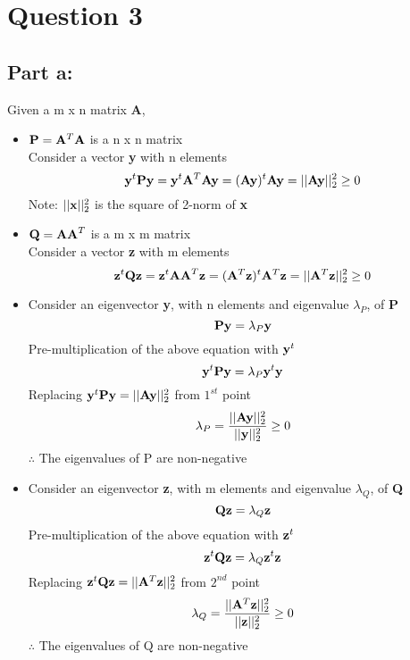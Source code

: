 \documentclass[12pt, a4paper]{article}
\begin{document}
\vspace*{-22pt}
\section*{Question 3}

\subsection*{Part a:} 
Given a m x n matrix {\bf A},\\
\begin {itemize}
\item ${\bf P}={\bf A}^T{\bf A}$ is a n x n matrix\\
Consider a vector {\bf y} with n elements
\[{\bf y}^t{\bf Py}={\bf y}^t{\bf A}^T{\bf Ay}=({\bf Ay})^t{\bf Ay}= ||{\bf Ay}||_2^2\geq 0\] 
Note: $||{\bf x}||_2^2$ is the square of 2-norm of {\bf x}

\item ${\bf Q}={\bf AA}^T$ is a m x m matrix\\
Consider a vector {\bf z} with m elements
\[{\bf z}^t{\bf Qz}={\bf z}^t{\bf AA}^T{\bf z}=({\bf A}^T{\bf z})^t{\bf A}^T{\bf z}=||{\bf A}^T{\bf z}||_2^2\geq 0\] 

\item Consider an eigenvector {\bf y}, with n elements and eigenvalue $\lambda_P$, of {\bf P}
\[{\bf Py}= \lambda_P{\bf y}\] 
Pre-multiplication of the above equation with ${\bf y}^t$
\[{\bf y}^t{\bf Py}=\lambda_P{\bf y}^t{\bf y}\]
Replacing ${\bf y}^t{\bf Py}=||{\bf Ay}||_2^2$ from $1^{st}$ point
\[\lambda_P=\frac{||{\bf Ay}||_2^2}{||{\bf y}||_2^2}\geq 0\]
$\therefore$ The eigenvalues of P are non-negative

\item Consider an eigenvector {\bf z}, with m elements and eigenvalue $\lambda_Q$, of {\bf Q}
\[{\bf Qz}= \lambda_Q{\bf z}\] 
Pre-multiplication of the above equation with ${\bf z}^t$
\[{\bf z}^t{\bf Qz}=\lambda_Q{\bf z}^t{\bf z}\]
Replacing ${\bf z}^t{\bf Qz}=||{\bf A}^T{\bf z}||_2^2$ from $2^{nd}$ point
\[\lambda_Q=\frac{||{\bf A}^T{\bf z}||_2^2}{||{\bf z}||_2^2}\geq 0\]
$\therefore$ The eigenvalues of Q are non-negative

\end {itemize}
\pagebreak
\end{document}
